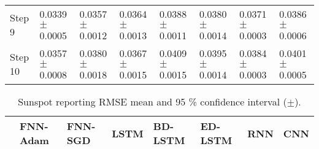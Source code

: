 \documentclass{ieeeaccess}
\begin{document}
\begin{table*}[htbp]
\begin{tabular}{llllllll}
Step 9 &  0.0339 $\pm$  0.0005 & 0.0357 $\pm$   0.0012  & 0.0364 $\pm$   0.0013  &  0.0388 $\pm$ 0.0011 &  0.0380 $\pm$  0.0014  &  0.0371 $\pm$  0.0003 & 0.0386$\pm$	0.0006 \\

Step 10 &  0.0357 $\pm$  0.0008 & 0.0380 $\pm$   0.0018  & 0.0367$\pm$   0.0015  &  0.0409 $\pm$  0.0015 &  0.0395 $\pm$  0.0014  &  0.0384 $\pm$  0.0003 & 0.0401$\pm$	0.0005 \\
\hline
\end{tabular}

\end{table*}



\begin{table*}[htbp]
 \smaller 
 \caption{Sunspot reporting RMSE mean and 95 \% confidence interval   ($\pm$).}
\label{tab:sunspot}
\begin{tabular}{llllllll}
\hline
 &  FNN-Adam& FNN-SGD & LSTM & BD-LSTM  & ED-LSTM & RNN & CNN\\
\hline
\hline
							

\end{tabular}
\end{table*}
\end{document}
